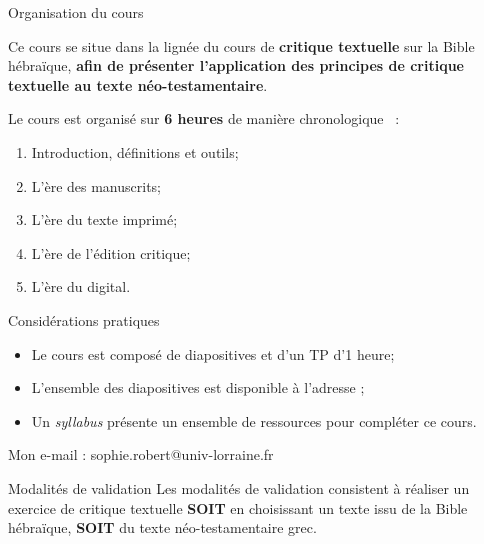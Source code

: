 \documentclass[11pt]{beamer}
\begin{document}
\subtitle{Session 2 : Nouveau Testament}

\begin{frame}{}
	\titlepage
\end{frame}


\begin{frame}{Organisation du cours}
\begin{alertblock}{}
    Ce cours se situe dans la lignée du cours de \textbf{critique textuelle} sur la Bible hébraïque, \textbf{afin de présenter l'application des principes de critique textuelle au texte néo-testamentaire}.
    \pause
    
\end{alertblock}
Le cours est organisé sur \textbf{6 heures} de manière \og chronologique \fg\ :

\begin{enumerate}
    \item Introduction, définitions et outils;
    \item L'ère des manuscrits;
    \item L'ère du texte imprimé;
    \item L'ère de l'édition critique;
    \item L'ère du digital.
\end{enumerate}
\end{frame}

\begin{frame}{Considérations pratiques}

\begin{itemize}
    \item Le cours est composé de diapositives et d'un TP d'1 heure;
    \item L'ensemble des diapositives est disponible à l'adresse ;
    \item Un \textit{syllabus} présente un ensemble de ressources pour compléter ce cours.
\end{itemize}

\begin{alertblock}{}
    Mon e-mail : sophie.robert@univ-lorraine.fr
\end{alertblock}
\end{frame}

\begin{frame}{Modalités de validation}
    Les modalités de validation consistent à réaliser un exercice de critique textuelle \textbf{SOIT} en choisissant un texte issu de la Bible hébraïque, \textbf{SOIT} du texte néo-testamentaire grec.
\end{frame}
\end{document}
